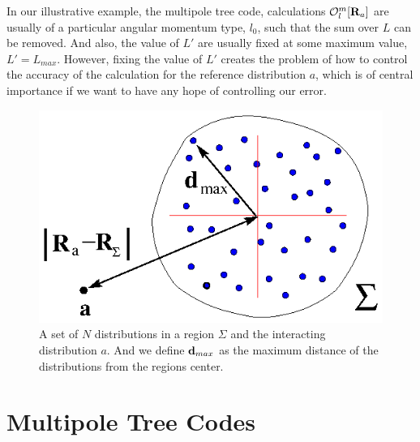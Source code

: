 \documentclass[prb,aps,nobibnotes,twocolumn,doublespace,twocolumngrid,superbib]{revtex4}
\begin{document}
%
In our illustrative example, the  multipole tree code,  calculations ${\cal O}_{l}^{m}[\mathbf{R}_{a}]$ 
are usually of a particular angular momentum type, $l_0$, such that the sum over $L$ can be removed.
%
And also, the value of $L'$ are usually fixed at 
some maximum value, $L'=L_{max}$.
%
However, fixing the value of $L'$ creates the problem of how to control the accuracy of the calculation 
for the reference distribution $a$, which is of central importance if we want to have any hope of 
controlling our error.

%
%
\begin{figure}
\caption{A set of $N$ distributions in a region $\Sigma$ and the interacting distribution $a$.
And we define ${\bf d}_{max}$ as the maximum distance of the distributions from the regions center.}
{\centering \includegraphics {MultInBox.ps} \par} 
\label{figure:MultInBox} 
\end{figure}

\section{Multipole Tree Codes}
\end{document}
